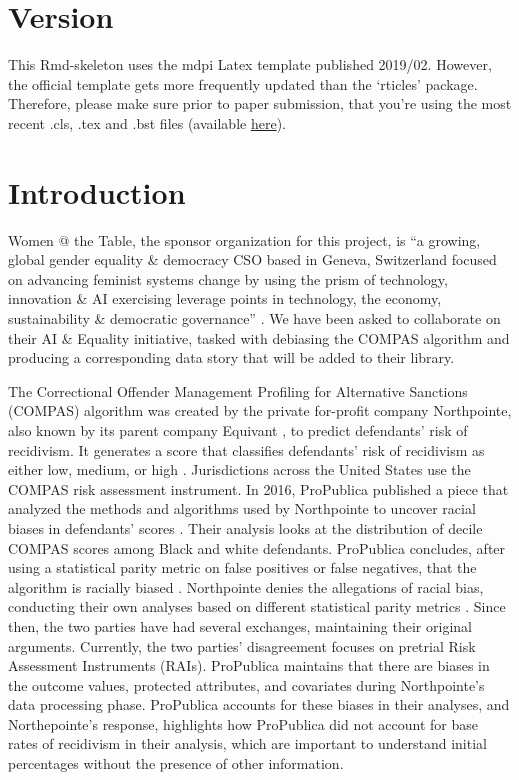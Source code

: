 \documentclass[water,article,submit,moreauthors,pdftex]{mdpi}
\begin{document}

\hypertarget{version}{%
\section{Version}\label{version}}

This Rmd-skeleton uses the mdpi Latex template published 2019/02.
However, the official template gets more frequently updated than the
`rticles' package. Therefore, please make sure prior to paper
submission, that you're using the most recent .cls, .tex and .bst files
(available \href{http://www.mdpi.com/authors/latex}{here}).

\hypertarget{introduction}{%
\section{Introduction}\label{introduction}}

Women @ the Table, the sponsor organization for this project, is ``a
growing, global gender equality \& democracy CSO based in Geneva,
Switzerland focused on advancing feminist systems change by using the
prism of technology, innovation \& AI exercising leverage points in
technology, the economy, sustainability \& democratic governance''
\citep{noauthor_womenthetable_nodate}. We have been asked to collaborate
on their AI \& Equality \citep{noauthor_ai_nodate} initiative, tasked
with debiasing the COMPAS algorithm
\citep{noauthor_aif360datasetscompasdataset_2018} and producing a
corresponding data story that will be added to their library.

The Correctional Offender Management Profiling for Alternative Sanctions
(COMPAS) algorithm was created by the private for-profit company
Northpointe, also known by its parent company Equivant
\citep{equivant_faq_nodate}, to predict defendants' risk of recidivism.
It generates a score that classifies defendants' risk of recidivism as
either low, medium, or high \citep{angwin2016machine}. Jurisdictions
across the United States use the COMPAS risk assessment instrument. In
2016, ProPublica published a piece that analyzed the methods and
algorithms used by Northpointe to uncover racial biases in defendants'
scores \citep{angwin2016machine}. Their analysis looks at the
distribution of decile COMPAS scores among Black and white defendants.
ProPublica concludes, after using a statistical parity metric on false
positives or false negatives, that the algorithm is racially biased
\citep{larson2016we}. Northpointe denies the allegations of racial bias,
conducting their own analyses based on different statistical parity
metrics \citep{equivant_response_2018}. Since then, the two parties have
had several exchanges, maintaining their original arguments. Currently,
the two parties' disagreement focuses on pretrial Risk Assessment
Instruments (RAIs). ProPublica maintains that there are biases in the
outcome values, protected attributes, and covariates during
Northpointe's data processing phase. ProPublica accounts for these
biases in their analyses, and Northepointe's response, highlights how
ProPublica did not account for base rates of recidivism in their
analysis, which are important to understand initial percentages without
the presence of other information.
\end{document}
